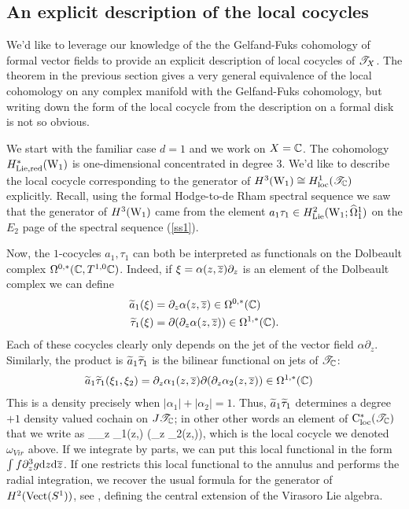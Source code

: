 \subsection{An explicit description of the local cocycles}

We'd like to leverage our knowledge of the the Gelfand-Fuks cohomology of formal vector fields to provide an explicit description of local cocycles of $\sT_X$. 
The theorem in the previous section gives a very general equivalence of the local cohomology on any complex manifold with the Gelfand-Fuks cohomology, but writing down the form of the local cocycle from the description on a formal disk is not so obvious.

We start with the familiar case $d=1$ and we work on $X = \CC$. 
The cohomology $H^*_{\rm Lie, red}(\W_1)$ is one-dimensional concentrated in degree $3$. 
We'd like to describe the local cocycle corresponding to the generator of $H^3(\W_1) \cong H^1_{\rm loc}(\sT_{\CC})$ explicitly. 
Recall, using the formal Hodge-to-de Rham spectral sequence we saw that the generator of $H^3(\W_1)$ came from the element $a_1 \tau_1 \in H^2_{\rm Lie} (\W_1 ; \hOmega^1_1)$ on the $E_2$ page of the spectral sequence (\ref{ss1}). 

Now, the $1$-cocycles $a_1,\tau_1$ can both be interpreted as functionals on the Dolbeault complex $\Omega^{0,*}(\CC, T^{1,0}\CC)$. 
Indeed, if $\xi = \alpha(z,\zbar) \partial_z$ is an element of the Dolbeault complex we can define
\begin{align*}
\Tilde{a}_1 (\xi) & = \partial_z \alpha(z,\zbar) \in \Omega^{0,*}(\CC) \\
\Tilde{\tau}_1 (\xi) & = \partial (\partial_z \alpha(z,\zbar)) \in \Omega^{1,*}(\CC) .
\end{align*}
Each of these cocycles clearly only depends on the jet of the vector field $\alpha \partial_z$.
Similarly, the product is $\Tilde{a}_1 \Tilde{\tau}_1$ is the bilinear functional on jets of $\sT_\CC$:
\begin{align*}
\Tilde{a}_1 \Tilde{\tau}_1 (\xi_1,\xi_2) & = \partial_z \alpha_1(z,\zbar)  \partial (\partial_z \alpha_2(z,\zbar)) \in \Omega^{1,*}(\CC)
\end{align*}
This is a density precisely when $|\alpha_1|+|\alpha_2| = 1$.
Thus, $\Tilde{a}_1 \Tilde{\tau}_1$ determines a degree $+1$ density valued cochain on $J \sT_\CC$; in other other words an element of $\cloc^*(\sT_\CC)$ that we write as
\ben
\int_\CC \partial_z \alpha_1(z,\zbar)  \partial (\partial_z \alpha_2(z,\zbar)),
\een
which is the local cocycle we denoted $\omega_{Vir}$ above.
If we integrate by parts, we can put this local functional in the form $\int f \partial^3_z g \d z \d \zbar$.
If one restricts this local functional to the annulus and performs the radial integration, we recover the usual formula for the generator of $H^2({\rm Vect}(S^1))$, see \cite{BWVir}, defining the central extension of the Virasoro Lie algebra.

